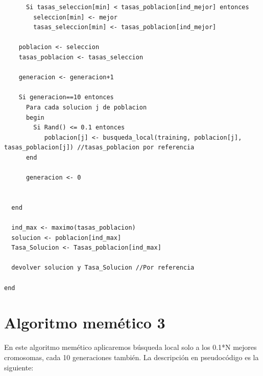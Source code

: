 \begin{lstlisting}
      Si tasas_seleccion[min] < tasas_poblacion[ind_mejor] entonces
        seleccion[min] <- mejor
        tasas_seleccion[min] <- tasas_poblacion[ind_mejor]

    poblacion <- seleccion
    tasas_poblacion <- tasas_seleccion
    
    generacion <- generacion+1
    
    Si generacion==10 entonces
      Para cada solucion j de poblacion
      begin
        Si Rand() <= 0.1 entonces
           poblacion[j] <- busqueda_local(training, poblacion[j], tasas_poblacion[j]) //tasas_poblacion por referencia
      end
      
      generacion <- 0
      
      
  end

  ind_max <- maximo(tasas_poblacion)
  solucion <- poblacion[ind_max]
  Tasa_Solucion <- Tasas_poblacion[ind_max]

  devolver solucion y Tasa_Solucion //Por referencia

end
\end{lstlisting}


\section{Algoritmo memético 3}
En este algoritmo memético aplicaremos búsqueda local solo a los 0.1*N mejores cromosomas, cada 10 generaciones también. La descripción en pseudocódigo es la siguiente:

